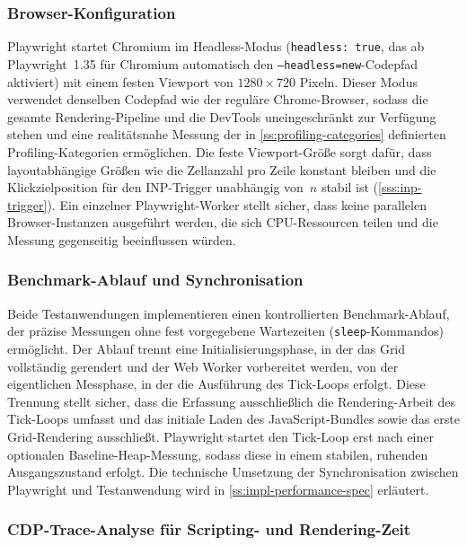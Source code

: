 \subsubsection{Browser-Konfiguration}
\label{sss:browser-config}

Playwright startet Chromium im Headless-Modus (\texttt{headless: true}, das ab Playwright~1.35 für Chromium automatisch den \texttt{--headless=new}-Codepfad aktiviert) mit einem festen Viewport von $1280 \times 720$ Pixeln. Dieser Modus verwendet denselben Codepfad wie der reguläre Chrome-Browser, sodass die gesamte Rendering-Pipeline und die DevTools uneingeschränkt zur Verfügung stehen \cite{chrome-headless-new-2024} und eine realitätsnahe Messung der in \cref{ss:profiling-categories} definierten Profiling-Kategorien ermöglichen. Die feste Viewport-Größe sorgt dafür, dass layoutabhängige Größen wie die Zellanzahl pro Zeile konstant bleiben und die Klickzielposition für den INP-Trigger unabhängig von~$n$ stabil ist (\cref{sss:inp-trigger}). Ein einzelner Playwright-Worker stellt sicher, dass keine parallelen Browser-Instanzen ausgeführt werden, die sich CPU-Ressourcen teilen und die Messung gegenseitig beeinflussen würden.

\subsubsection{Benchmark-Ablauf und Synchronisation}
\label{sss:lifecycle}

Beide Testanwendungen implementieren einen kontrollierten Benchmark-Ablauf, der präzise Messungen ohne fest vorgegebene Wartezeiten (\texttt{sleep}-Kommandos) ermöglicht. Der Ablauf trennt eine Initialisierungsphase, in der das Grid vollständig gerendert und der Web Worker vorbereitet werden, von der eigentlichen Messphase, in der die Ausführung des Tick-Loops erfolgt. Diese Trennung stellt sicher, dass die Erfassung ausschließlich die Rendering-Arbeit des Tick-Loops umfasst und das initiale Laden des JavaScript-Bundles sowie das erste Grid-Rendering ausschließt. Playwright startet den Tick-Loop erst nach einer optionalen Baseline-Heap-Messung, sodass diese in einem stabilen, ruhenden Ausgangszustand erfolgt. Die technische Umsetzung der Synchronisation zwischen Playwright und Testanwendung wird in \cref{ss:impl-performance-spec} erläutert.

\subsubsection{CDP-Trace-Analyse für Scripting- und Rendering-Zeit}
\label{sss:cdp-trace}

